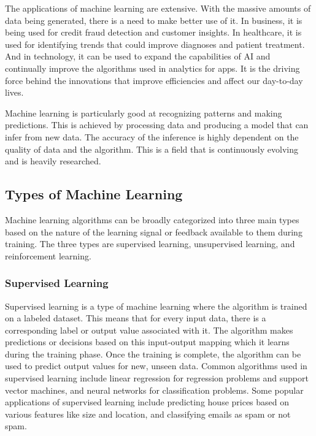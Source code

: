 The applications of machine learning are extensive. With the massive amounts of data being generated, there is a need to make better use of it. In business, it is being used for credit fraud detection and customer insights. In healthcare, it is used for identifying trends that could improve diagnoses and patient treatment. And in technology, it can be used to expand the capabilities of AI and continually improve the algorithms used in analytics for apps. It is the driving force behind the innovations that improve efficiencies and affect our day-to-day lives.

Machine learning is particularly good at recognizing patterns and making predictions. This is achieved by processing data and producing a model that can infer from new data. The accuracy of the inference is highly dependent on the quality of data and the algorithm. This is a field that is continuously evolving and is heavily researched.


\subsection{Types of Machine Learning}

Machine learning algorithms can be broadly categorized into three main types based on the nature of the learning signal or feedback available to them during training. The three types are supervised learning, unsupervised learning, and reinforcement learning.

\subsubsection{Supervised Learning}
Supervised learning is a type of machine learning where the algorithm is trained on a labeled dataset. This means that for every input data, there is a corresponding label or output value associated with it. The algorithm makes predictions or decisions based on this input-output mapping which it learns during the training phase. Once the training is complete, the algorithm can be used to predict output values for new, unseen data. Common algorithms used in supervised learning include linear regression for regression problems and support vector machines, and neural networks for classification problems. Some popular applications of supervised learning include predicting house prices based on various features like size and location, and classifying emails as spam or not spam.

